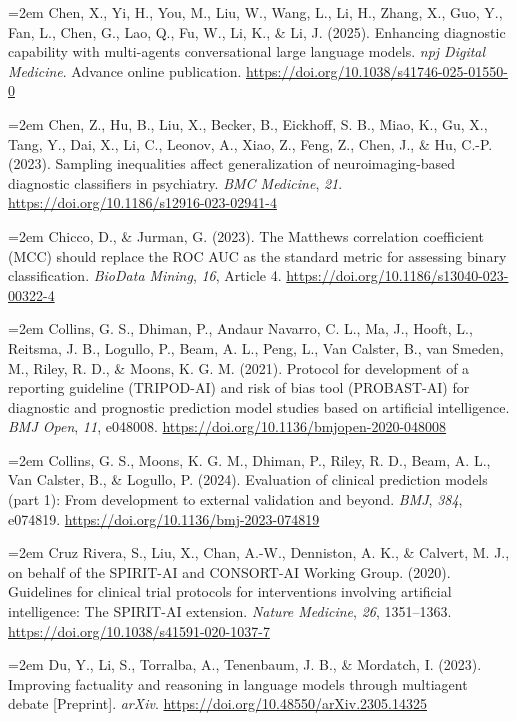 \documentclass[11pt,a4paper,twoside]{article}
\begin{document}
\hangindent=2em Chen, X., Yi, H., You, M., Liu, W., Wang, L., Li, H., Zhang, X., Guo, Y., Fan, L., Chen, G., Lao, Q., Fu, W., Li, K., \& Li, J. (2025). Enhancing diagnostic capability with multi-agents conversational large language models. \textit{npj Digital Medicine}. Advance online publication. \url{https://doi.org/10.1038/s41746-025-01550-0}

\hangindent=2em Chen, Z., Hu, B., Liu, X., Becker, B., Eickhoff, S. B., Miao, K., Gu, X., Tang, Y., Dai, X., Li, C., Leonov, A., Xiao, Z., Feng, Z., Chen, J., \& Hu, C.-P. (2023). Sampling inequalities affect generalization of neuroimaging-based diagnostic classifiers in psychiatry. \textit{BMC Medicine}, \textit{21}. \url{https://doi.org/10.1186/s12916-023-02941-4}

\hangindent=2em Chicco, D., \& Jurman, G. (2023). The Matthews correlation coefficient (MCC) should replace the ROC AUC as the standard metric for assessing binary classification. \textit{BioData Mining}, \textit{16}, Article 4. \url{https://doi.org/10.1186/s13040-023-00322-4}

\hangindent=2em Collins, G. S., Dhiman, P., Andaur Navarro, C. L., Ma, J., Hooft, L., Reitsma, J. B., Logullo, P., Beam, A. L., Peng, L., Van Calster, B., van Smeden, M., Riley, R. D., \& Moons, K. G. M. (2021). Protocol for development of a reporting guideline (TRIPOD-AI) and risk of bias tool (PROBAST-AI) for diagnostic and prognostic prediction model studies based on artificial intelligence. \textit{BMJ Open}, \textit{11}, e048008. \url{https://doi.org/10.1136/bmjopen-2020-048008}

\hangindent=2em Collins, G. S., Moons, K. G. M., Dhiman, P., Riley, R. D., Beam, A. L., Van Calster, B., \& Logullo, P. (2024). Evaluation of clinical prediction models (part 1): From development to external validation and beyond. \textit{BMJ}, \textit{384}, e074819. \url{https://doi.org/10.1136/bmj-2023-074819}

\hangindent=2em Cruz Rivera, S., Liu, X., Chan, A.-W., Denniston, A. K., \& Calvert, M. J., on behalf of the SPIRIT-AI and CONSORT-AI Working Group. (2020). Guidelines for clinical trial protocols for interventions involving artificial intelligence: The SPIRIT-AI extension. \textit{Nature Medicine}, \textit{26}, 1351--1363. \url{https://doi.org/10.1038/s41591-020-1037-7}

\hangindent=2em Du, Y., Li, S., Torralba, A., Tenenbaum, J. B., \& Mordatch, I. (2023). Improving factuality and reasoning in language models through multiagent debate [Preprint]. \textit{arXiv}. \url{https://doi.org/10.48550/arXiv.2305.14325}
\end{document}
